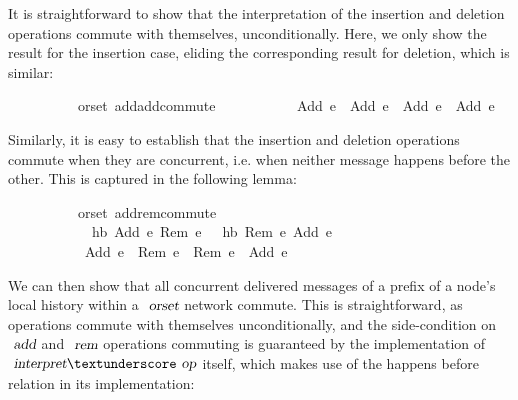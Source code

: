 It is straightforward to show that the interpretation of the insertion and deletion operations commute with themselves, unconditionally.
Here, we only show the result for the insertion case, eliding the corresponding result for deletion, which is similar:
\vspace{0.375em}
\begin{isabellebody}
\ \ \ \ \ \ \ \ \ {\isacharparenleft}\ orset{\isacharparenright}\ add{\isacharunderscore}add{\isacharunderscore}commute{\isacharcolon}\isanewline
\ \ \ \ \ \ \ \ \ \ \ {\isachardoublequoteopen}{\isasymlangle}Add\ e{}{\isasymrangle}\ {\isasymrhd}\ {\isasymlangle}Add\ e{}{\isasymrangle}\ {\isacharequal}\ {\isasymlangle}Add\ e{}{\isasymrangle}\ {\isasymrhd}\ {\isasymlangle}Add\ e{}{\isasymrangle}{\isachardoublequoteclose}
\end{isabellebody}
\vspace{0.375em}
Similarly, it is easy to establish that the insertion and deletion operations commute when they are concurrent, i.e. when neither message happens before the other.
This is captured in the following lemma:
\vspace{0.375em}
\begin{isabellebody}
\ \ \ \ \ \ \ \ \ {\isacharparenleft}\ orset{\isacharparenright}\ add{\isacharunderscore}rem{\isacharunderscore}commute{\isacharcolon}\isanewline
\ \ \ \ \ \ \ \ \ \ \ {\isachardoublequoteopen}{\isasymnot}\ hb\ {\isacharparenleft}Add\ e{}{\isacharparenright}\ {\isacharparenleft}Rem\ e{}{\isacharparenright}\ {\isasymand}\ {\isasymnot}\ hb\ {\isacharparenleft}Rem\ e{}{\isacharparenright}\ {\isacharparenleft}Add\ e{}{\isacharparenright}{\isachardoublequoteclose}\isanewline
\ \ \ \ \ \ \ \ \ \ \ {\isachardoublequoteopen}{\isasymlangle}Add\ e{}{\isasymrangle}\ {\isasymrhd}\ {\isasymlangle}Rem\ e{}{\isasymrangle}\ {\isacharequal}\ {\isasymlangle}Rem\ e{}{\isasymrangle}\ {\isasymrhd}\ {\isasymlangle}Add\ e{}{\isasymrangle}{\isachardoublequoteclose}
\end{isabellebody}
\vspace{0.375em}
We can then show that all concurrent delivered messages of a prefix of a node's local history within a $\isa{orset}$ network commute.
This is straightforward, as operations commute with themselves unconditionally, and the side-condition on $\isa{add}$ and $\isa{rem}$ operations commuting is guaranteed by the implementation of $\isa{interpret}{\isacharunderscore}\isa{op}$ itself, which makes use of the happens before relation in its implementation:
